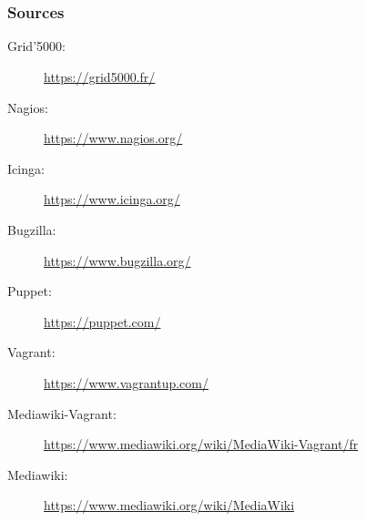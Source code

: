 \documentclass[11pt,compress,final]{beamer}
\begin{document}
\section*{}
\begin{frame}
\frametitle{Sources}
\begin{scriptsize}
\begin{description}
\item[Grid'5000:]\url{https://grid5000.fr/}
\item[Nagios:]\url{https://www.nagios.org/}
\item[Icinga:]\url{https://www.icinga.org/}
\item[Bugzilla:]\url{https://www.bugzilla.org/}
\item[Puppet:]\url{https://puppet.com/}
\item[Vagrant:]\url{https://www.vagrantup.com/}
\item[Mediawiki-Vagrant:]\url{https://www.mediawiki.org/wiki/MediaWiki-Vagrant/fr}
\item[Mediawiki:]\url{https://www.mediawiki.org/wiki/MediaWiki}
\end{description}
\end{scriptsize}
\end{frame}
\end{document}
